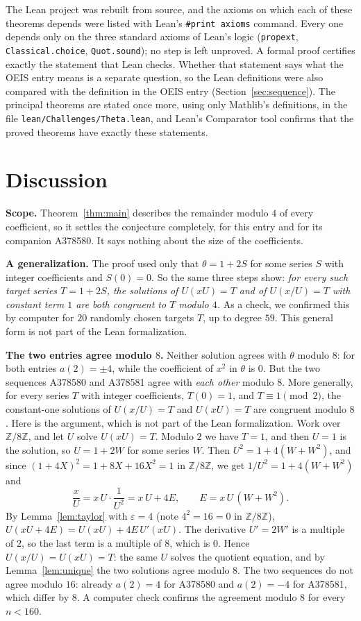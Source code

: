 \documentclass[11pt,a4paper]{article}
\theoremstyle{definition}
\theoremstyle{remark}
\newcommand{\Z}{\mathbb{Z}}
\newcommand{\para}[1]{\par\medskip\noindent\textbf{#1}\enspace}
\begin{document}
The Lean project was rebuilt from source, and the axioms on which each of these theorems depends were listed with
Lean's \texttt{\#print axioms} command. Every one depends only on the three standard axioms of Lean's logic
(\texttt{propext}, \texttt{Classical.choice}, \texttt{Quot.sound}); no step is left unproved. A formal proof certifies
exactly the statement that Lean checks. Whether that statement says what the OEIS entry means is a separate question,
so the Lean definitions were also compared with the definition in the OEIS entry
(Section~\ref{sec:sequence}). The principal theorems are stated once more, using only Mathlib's definitions, in the
file \texttt{lean/Challenges/Theta.lean}, and Lean's Comparator tool confirms that the
proved theorems have exactly these statements.

\section{Discussion}\label{sec:discussion}

\para{Scope.} Theorem~\ref{thm:main} describes the remainder modulo $4$ of every coefficient, so it settles the
conjecture completely, for this entry and for its companion A378580. It says nothing about the size of the
coefficients.

\para{A generalization.} The proof used only that $\theta=1+2S$ for some series $S$ with integer coefficients and
$S(0)=0$. So the same three steps show: \emph{for every such target series $T=1+2S$, the solutions of $U(xU)=T$ and of
$U(x/U)=T$ with constant term $1$ are both congruent to $T$ modulo $4$.} As a check, we confirmed this by computer for
$20$ randomly chosen targets $T$, up to degree $59$. This general form is not part of the Lean formalization.

\para{The two entries agree modulo $8$.} Neither solution agrees with $\theta$ modulo $8$: for both entries
$a(2)=\pm4$, while the coefficient of $x^2$ in $\theta$ is $0$. But the two sequences A378580 and A378581 agree with
\emph{each other} modulo $8$. More generally, for every series $T$ with integer coefficients, $T(0)=1$, and $T\equiv1\pmod 2$, the
constant-one solutions of $U(x/U)=T$ and $U(xU)=T$ are congruent modulo $8$. Here is the argument, which is not part of the Lean
formalization. Work over $\Z/8\Z$, and let $U$ solve $U(xU)=T$. Modulo $2$ we have $T=1$, and then $U=1$ is the
solution, so $U=1+2W$ for some series $W$. Then $U^2=1+4(W+W^2)$, and since $(1+4X)^2=1+8X+16X^2=1$ in $\Z/8\Z$, we get
$1/U^2=1+4(W+W^2)$ and
\[
\frac xU=x\,U\cdot\frac1{U^2}=x\,U+4E,\qquad E=x\,U\,(W+W^2).
\]
By Lemma~\ref{lem:taylor} with $\varepsilon=4$ (note $4^2=16=0$ in $\Z/8\Z$),
$U(xU+4E)=U(xU)+4E\,U'(xU)$. The derivative $U'=2W'$ is a multiple of $2$, so the last term is a multiple of $8$, which
is $0$. Hence $U(x/U)=U(xU)=T$: the same $U$ solves the quotient equation, and by Lemma~\ref{lem:unique} the two
solutions agree modulo $8$. The two sequences do not agree modulo $16$: already $a(2)=4$ for A378580 and $a(2)=-4$ for
A378581, which differ by $8$. A computer check confirms the agreement modulo $8$ for every $n<160$.
\end{document}
